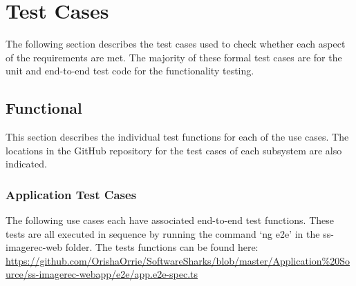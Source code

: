 \documentclass[a4paper, 11pt]{article}
\begin{document}
\pagebreak
\section{Test Cases}
The following section describes the test cases used to check whether each aspect of the requirements are met. The majority of these formal test cases are for the unit and end-to-end test code for the functionality testing.
    
    \subsection{Functional}
    This section describes the individual test functions for each of the use cases. The locations in the GitHub repository for the test cases of each subsystem are also indicated.

        \subsubsection{Application Test Cases}
        The following use cases each have associated end-to-end test functions. These tests are all executed in sequence by running the command ‘ng e2e’ in the ss-imagerec-web folder. The tests functions can be found here:\\
        \url{https://github.com/OrishaOrrie/SoftwareSharks/blob/master/Application\%20Source/ss-imagerec-webapp/e2e/app.e2e-spec.ts}
        
\end{document}
